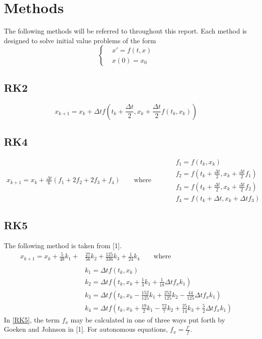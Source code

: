 \documentclass{article}
\begin{document}
\section{Methods}
The following methods will be referred to throughout this report. Each method is designed to solve initial value problems of the form
\begin{equation} \label{eq:IVP}
\left\{
\begin {aligned}
& x' = f(t, x) \\
& x(0) = x_0
\end{aligned}
\right.
\end{equation}
\subsection{RK2}
\begin{equation} \label{RK2}
x_{k+1} = x_k + \Delta t f(t_k + \frac{\Delta t}{2}, x_k + \frac{\Delta t}{2}f(t_k, x_k))
\end{equation}
\subsection{RK4}
\begin{equation} \label{RK4}
\begin{split}
x_{k+1} = x_k + \frac{\Delta t}{6}(f_1 + 2f_2 + 2f_3 + f_4) \quad\quad \textrm{where} \quad\quad
\end{split}
\begin{split}
& f_1 = f(t_k, x_k) \\
& f_2 = f(t_k + \frac{\Delta t}{2}, x_k + \frac{\Delta t}{2}f_1) \\
& f_3 = f(t_k + \frac{\Delta t}{2}, x_k + \frac{\Delta t}{2}f_2) \\
& f_4 = f(t_k + \Delta t, x_k + \Delta t f_3)
\end{split}
\end{equation}
\subsection{RK5}
The following method is taken from [1].
\begin{equation} \label{RK5}
\begin{split}
x_{k+1} = x_k + \frac{5}{48}k_1 + &\frac{27}{56}k_2 + \frac{125}{336}k_3 + \frac{1}{24}k_4 \quad\quad \textrm{where} \quad\quad \\
\\
& k_1 = \Delta t f(t_k, x_k) \\
& k_2 = \Delta t f(t_k, x_k + \frac{1}{3}k_1 + \frac{1}{18}\Delta t f_x k_1) \\
& k_3 = \Delta t f(t_k, x_k - \frac{152}{125}k_1 + \frac{252}{125}k_2 - \frac{44}{125}\Delta t f_x k_1) \\
& k_4 = \Delta t f(t_k, x_k + \frac{19}{2}k_1 - \frac{72}{7}k_2 + \frac{25}{14}k_3 + \frac{5}{2}\Delta t f_x k_1)
\end{split}
\end{equation}
In \ref{RK5}, the term $f_x$ may be calculated in one of three ways put forth by Goeken and Johnson in [1]. For autonomous equations, $f_x = \frac{f'}{f}$.
\end{document}
